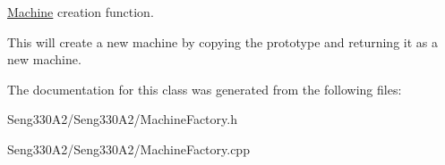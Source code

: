 \hyperlink{class_machine}{Machine} creation function. 

This will create a new machine by copying the prototype and returning it as a new machine. 

The documentation for this class was generated from the following files\+:\begin{DoxyCompactItemize}
\item 
Seng330\+A2/\+Seng330\+A2/Machine\+Factory.\+h\item 
Seng330\+A2/\+Seng330\+A2/Machine\+Factory.\+cpp\end{DoxyCompactItemize}
